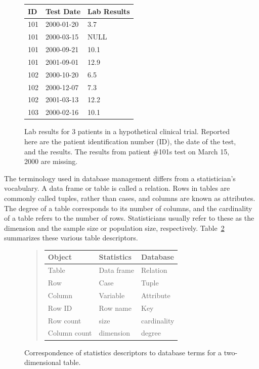 \begin{figure}
\begin{tabular}{lll}
ID & Test Date & Lab Results \\
\hline
101 & 2000-01-20 & 3.7 \\
101 & 2000-03-15 & NULL \\
101 & 2000-09-21 & 10.1 \\
101 & 2001-09-01 & 12.9 \\
102 & 2000-10-20 & 6.5  \\
102 & 2000-12-07 & 7.3  \\
102 & 2001-03-13 & 12.2 \\
103 & 2000-02-16 & 10.1 \\
\end{tabular}
\caption{Lab results for 3 patients in a hypothetical clinical trial.
Reported here are the patient identification number (ID),
the date of the test, and the results. The results from patient
\#101s test on March 15, 2000 are missing.}
\label{dbms:fig:CTsimple}
\end{figure}

The terminology used in database management differs from a 
statistician's vocabulary.  
A data frame or table is called a relation.
Rows in tables are  commonly called tuples, rather than cases,
and columns are known as attributes.
The degree of a table corresponds to its number of columns, 
and the cardinality of a table refers to the number of rows.
Statisticians usually refer to these as the dimension and 
the sample size or population size, respectively.
Table~\ref{dbms:fig:terms} summarizes these various table descriptors.

\begin{figure}
\begin{quote}
\begin{tabular}{lll}
Object & Statistics & Database \\
\hline
Table & Data frame & Relation \\ 
Row & Case & Tuple \\
Column & Variable & Attribute\\
Row ID & Row name & Key \\
Row count & size & cardinality\\
Column count & dimension & degree\\
\end{tabular}
\end{quote}
\caption{Correspondence of statistics descriptors to database terms for
a two-dimensional table.}\label{dbms:fig:terms} 
\end{figure}


